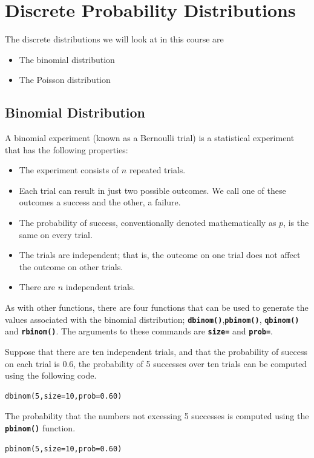\documentclass[a4paper,12pt]{article}
\begin{document}
\section{Discrete Probability Distributions}
The discrete distributions we will look at in this course are
\begin{itemize}
\item The binomial distribution
\item The Poisson distribution
\end{itemize}
\subsection{Binomial Distribution}

A binomial experiment (known as a Bernoulli trial) is a statistical experiment that has the following properties: 

\begin{itemize}
\item	The experiment consists of $n$ repeated trials.
\item	Each trial can result in just two possible outcomes. We call one of these outcomes a success and the other, a failure.
\item	The probability of success, conventionally denoted mathematically as $p$, is the same on every trial.
\item	The trials are independent; that is, the outcome on one trial does not affect the outcome on other trials.
\item	There are $n$ independent trials.
\end{itemize}
 

As with other functions, there are four functions that can be used to generate the values associated with the binomial distribution; \textbf{\texttt{dbinom()}},\textbf{\texttt{pbinom()}}, \textbf{\texttt{qbinom()}} and \textbf{\texttt{rbinom()}}.
The arguments to these commands are \texttt{\textbf{size=}} and \texttt{\textbf{prob=}}.

Suppose that there are ten independent trials, and that the probability of success on each trial is 0.6, the probability of 5 successes over ten trials can be computed using the following code.
\begin{framed}
\begin{verbatim}
dbinom(5,size=10,prob=0.60)
\end{verbatim}
\end{framed}
The probability that the numbers not excessing 5 successes is computed using the \textbf{\texttt{pbinom()}} function.
\begin{framed}
\begin{verbatim}
pbinom(5,size=10,prob=0.60)
\end{verbatim}
\end{framed}
\end{document}
